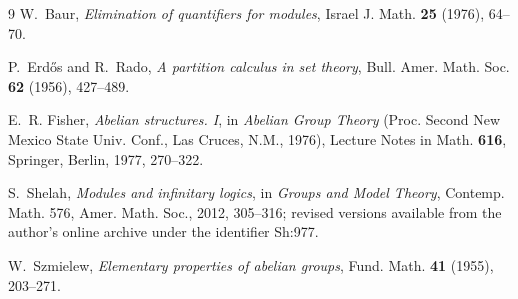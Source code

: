 \documentclass[11pt]{article}
\begin{document}
\begin{thebibliography}{9}
    W.~Baur,
    \emph{Elimination of quantifiers for modules},
    Israel J. Math. \textbf{25} (1976), 64--70.
    
    P.~Erd\H{o}s and R.~Rado,
    \emph{A partition calculus in set theory},
    Bull. Amer. Math. Soc. \textbf{62} (1956), 427--489.
    
    E.~R. Fisher,
    \emph{Abelian structures. I},
    in \emph{Abelian Group Theory}
    (Proc. Second New Mexico State Univ. Conf., Las Cruces, N.M., 1976),
    Lecture Notes in Math. \textbf{616},
    Springer, Berlin, 1977, 270--322.    
    
    S.~Shelah,
    \emph{Modules and infinitary logics},
    in \emph{Groups and Model Theory}, Contemp. Math. 576,
    Amer. Math. Soc., 2012, 305--316;
    revised versions available from the author's online archive
    under the identifier Sh:977.
    
    W.~Szmielew,
    \emph{Elementary properties of abelian groups},
    Fund. Math. \textbf{41} (1955), 203--271.
\end{thebibliography}
\end{document}
